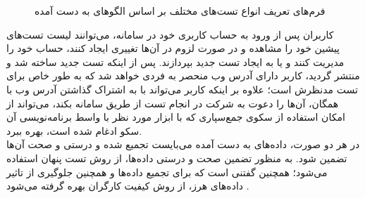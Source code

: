 \begin{figure}
{	}
	\caption[فرم‌های تعریف انواع تست‌های مختلف بر اساس الگوهای به دست آمده]
	{فرم‌های تعریف انواع تست‌های مختلف بر اساس الگوهای به دست آمده
	}
	\label{fig:pages}
\end{figure}
کاربران پس از ورود به حساب کاربری خود در سامانه، می‌توانند لیست تست‌های پیشین خود را مشاهده و در صورت لزوم در آن‌ها تغییری ایجاد کنند، حساب خود را مدیریت کنند و یا به ایجاد تست جدید بپردازند. پس از اینکه تست جدید ساخته شد و منتشر گردید، کاربر دارای آدرس وب منحصر به فردی خواهد شد که به طور خاص برای تست مدنظرش است؛ علاوه بر اینکه کاربر می‌تواند با به اشتراک گذاشتن آدرس وب با همگان، آن‌ها را دعوت به شرکت در انجام تست از طریق سامانه بکند، می‌تواند از امکان استفاده از سکوی جمع‌سپاری
که با ابزار مورد نظر با واسط برنامه‌نویسی آن سکو ادغام شده است، بهره ببرد.\\
در هر دو صورت، داده‌های به دست آمده می‌بایست تجمیع شده و درستی و صحت آن‌ها تضمین شود. به منظور تضمین صحت و درستی داده‌ها، از روش تست پنهان استفاده می‌شود؛ همچنین گفتنی است که برای تجمیع داده‌ها و همچنین جلوگیری از تاثیر داده‌های هرز، از روش کیفیت کارگران بهره گرفته می‌شود
\cite{li_crowdsourced_2016}.


















